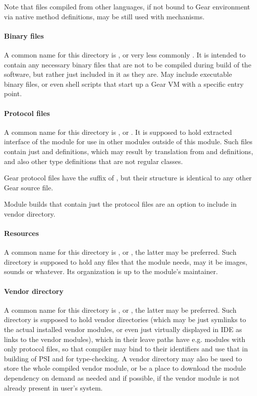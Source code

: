 Note that files compiled from other languages, if not bound to Gear environment via native method definitions, may be still used with  mechanisms. 

\paragraph{Binary files}
A common name for this directory is , or very less commonly . It is intended to contain any necessary binary files that are not to be compiled during build of the software, but rather just included in it as they are. May include executable binary files, or even shell scripts that start up a Gear VM with a specific entry point. 

\paragraph{Protocol files}
A common name for this directory is , or . It is supposed to hold extracted interface of the module for use in other modules outside of this module. Such files contain just  and  definitions, which may result by translation from  and  definitions, and also other type definitions that are not regular classes. 

Gear protocol files have the suffix of , but their structure is identical to any other Gear source file. 

Module builds that contain just the protocol files are an option to include in vendor directory. 

\paragraph{Resources}
A common name for this directory is , or , the latter may be preferred. Such directory is supposed to hold any files that the module needs, may it be images, sounds or whatever. Its organization is up to the module's maintainer. 

\paragraph{Vendor directory}
A common name for this directory is , or , the latter may be preferred. Such directory is supposed to hold vendor directories (which may be just symlinks to the actual installed vendor modules, or even just virtually displayed in IDE as links to the vendor modules), which in their leave paths have e.g. modules with only protocol files, so that compiler may bind to their identifiers and use that in building of PSI and for type-checking. A vendor directory may also be used to store the whole compiled vendor module, or be a place to download the module dependency on demand as needed and if possible, if the vendor module is not already present in user's system. 

